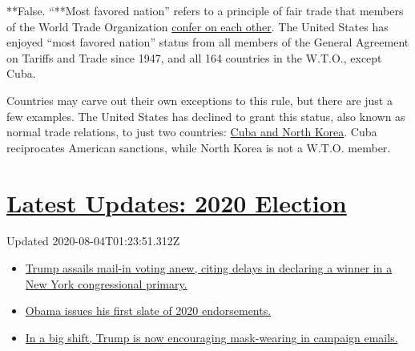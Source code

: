 **False. ``**Most favored nation'' refers to a principle of fair trade
that members of the World Trade Organization
\href{https://www.wto.org/english/thewto_e/whatis_e/tif_e/fact2_e.htm}{confer
on each other}. The United States has enjoyed ``most favored nation''
status from all members of the General Agreement on Tariffs and Trade
since 1947, and all 164 countries in the W.T.O., except Cuba.

Countries may carve out their own exceptions to this rule, but there are
just a few examples. The United States has declined to grant this
status, also known as normal trade relations, to just two countries:
\href{https://help.cbp.gov/s/article/Article-310?language=en_US}{Cuba
and North Korea}. Cuba reciprocates American sanctions, while North
Korea is not a W.T.O. member.

\hypertarget{latest-updates-2020-election}{%
\section{\texorpdfstring{\href{https://www.nytimes3xbfgragh.onion/2020/08/03/us/elections/biden-vs-trump.html?action=click\&pgtype=Article\&state=default\&region=MAIN_CONTENT_1\&context=storylines_live_updates}{Latest
Updates: 2020
Election}}{Latest Updates: 2020 Election}}\label{latest-updates-2020-election}}

Updated 2020-08-04T01:23:51.312Z

\begin{itemize}
\tightlist
\item
  \href{https://www.nytimes3xbfgragh.onion/2020/08/03/us/elections/biden-vs-trump.html?action=click\&pgtype=Article\&state=default\&region=MAIN_CONTENT_1\&context=storylines_live_updates\#link-6494b448}{Trump
  assails mail-in voting anew, citing delays in declaring a winner in a
  New York congressional primary.}
\item
  \href{https://www.nytimes3xbfgragh.onion/2020/08/03/us/elections/biden-vs-trump.html?action=click\&pgtype=Article\&state=default\&region=MAIN_CONTENT_1\&context=storylines_live_updates\#link-3de249e6}{Obama
  issues his first slate of 2020 endorsements.}
\item
  \href{https://www.nytimes3xbfgragh.onion/2020/08/03/us/elections/biden-vs-trump.html?action=click\&pgtype=Article\&state=default\&region=MAIN_CONTENT_1\&context=storylines_live_updates\#link-54e34d20}{In
  a big shift, Trump is now encouraging mask-wearing in campaign
  emails.}
\end{itemize}

